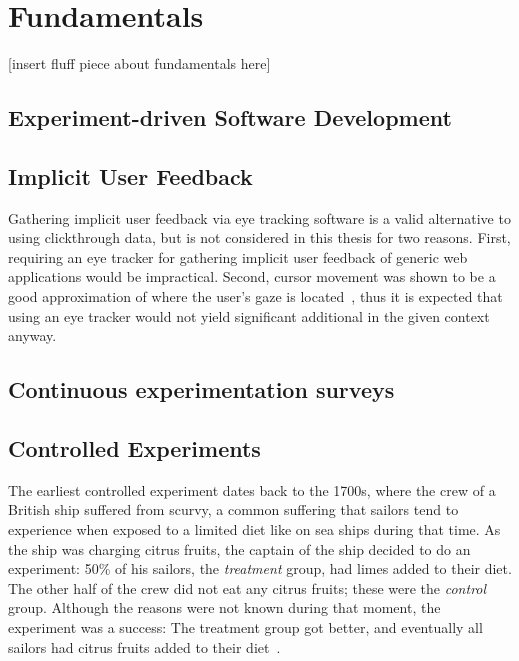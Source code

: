 %
\chapter{Fundamentals}
\label{ch:fundamentals}

[insert fluff piece about fundamentals here]

\section{Experiment-driven Software Development}
\label{sec:fundamentals:edsd}

\cite{Olsson2012}

\section{Implicit User Feedback}
\label{sec:fundamentals:implicit}

\cite{Kelly:2003:IFI:959258.959260}

Gathering implicit user feedback via eye tracking software is a valid alternative to using clickthrough data, but is not considered in this thesis for two reasons.
First, requiring an eye tracker for gathering implicit user feedback of generic web applications would be impractical.
Second, cursor movement was shown to be a good approximation of where the user's gaze is located~\cite{Huang2011}, thus it is expected that using an eye tracker would not yield significant additional in the given context anyway.

\section{Continuous experimentation surveys}
\label{sec:related:surveys}

\cite{lindgren2015software}

\cite{Bosch2012}

\cite{Gutbrod2017}

\section{Controlled Experiments}
\label{sec:fundamentals:experiments}

The earliest controlled experiment dates back to the 1700s, where the crew of a British ship suffered from scurvy, a common suffering that sailors tend to experience when exposed to a limited diet like on sea ships during that time.
As the ship was charging citrus fruits, the captain of the ship decided to do an experiment: 50\% of his sailors, the \emph{treatment} group, had limes added to their diet.
The other half of the crew did not eat any citrus fruits; these were the \emph{control} group.
Although the reasons were not known during that moment, the experiment was a success: The treatment group got better, and eventually all sailors had citrus fruits added to their diet~\cite{rossi2003evaluation,marks2000progress}.

